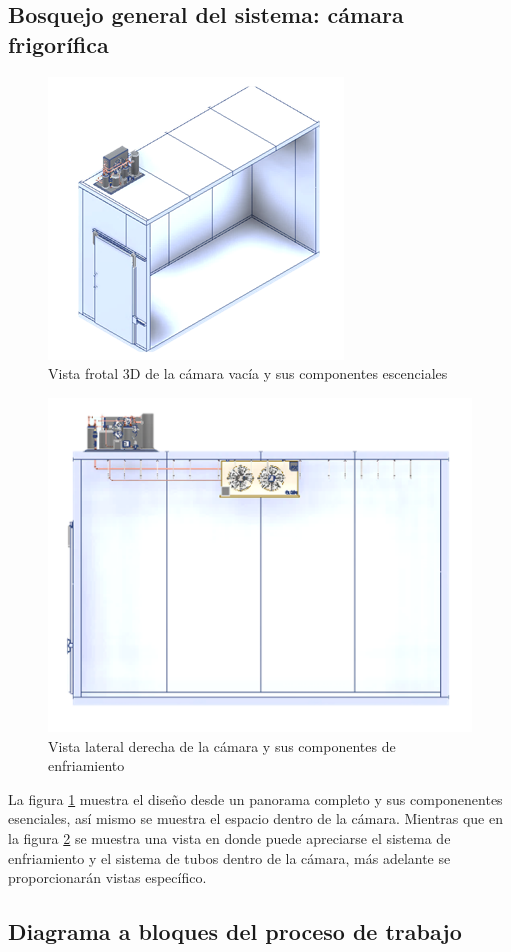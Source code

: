 \subsection{Bosquejo general del sistema: cámara frigorífica}\rsp
\begin{figure}[H]
	\centering
	\includegraphics[width=0.6\linewidth]{figures/design-cooler2}
	\caption{Vista frotal 3D de la cámara vacía y sus componentes escenciales}
	\label{fig:design1}
\end{figure}
\begin{figure}[H]
	\centering
	\includegraphics[width=0.6\linewidth]{figures/design-latder}
	\caption{Vista lateral derecha  de la cámara y sus componentes de enfriamiento}
	\label{fig:design-latder}
\end{figure}
La figura \ref{fig:design1} muestra el diseño desde un panorama completo y sus componenentes esenciales, así mismo se muestra el espacio dentro de la cámara.
Mientras que en la figura \ref{fig:design-latder} se muestra una vista en donde puede apreciarse el sistema de enfriamiento y el sistema de tubos dentro de la cámara, más adelante se proporcionarán vistas específico.


\subsection{Diagrama a bloques del proceso de trabajo}

